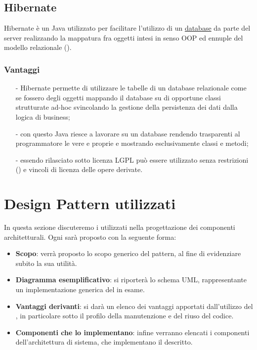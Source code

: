 \subsection{Hibernate}
Hibernate è un  Java utilizzato per facilitare l'utilizzo di un \underline{database} da parte del server realizzando la mappatura fra oggetti intesi in senso OOP ed ennuple del modello relazionale ().

\subsubsection*{Vantaggi}
\begin{itemize}
\item[-] Hibernate permette di utilizzare le tabelle di un database relazionale come se fossero degli oggetti mappando il database su di opportune classi strutturate ad-hoc svincolando la gestione della persistenza dei dati dalla logica di business;
\item[-] con questo  Java riesce a lavorare su un database rendendo trasparenti al programmatore le vere e proprie  e mostrando esclusivamente classi e metodi;
\item[-] essendo rilasciato sotto licenza LGPL può essere utilizzato senza restrizioni () e vincoli di licenza delle opere derivate. 
\end{itemize}
\clearpage

\section{Design Pattern utilizzati}
In questa sezione discuteremo i  utilizzati nella progettazione dei componenti architetturali. Ogni  sarà proposto con la seguente forma:
\begin{itemize}
	\item \textbf{Scopo}: verrà proposto lo scopo generico del pattern, al fine di evidenziare subito la sua utilità.
	\item \textbf{Diagramma esemplificativo}: si riporterà lo schema UML, rappresentante un implementazione generica del  in esame.
	\item \textbf{Vantaggi derivanti}: si darà un elenco dei vantaggi apportati dall'utilizzo del , in particolare sotto il profilo della manutenzione e del riuso del codice.
	\item \textbf{Componenti che lo implementano}: infine verranno elencati i componenti dell'architettura di sistema, che implementano il  descritto.
\end{itemize}

